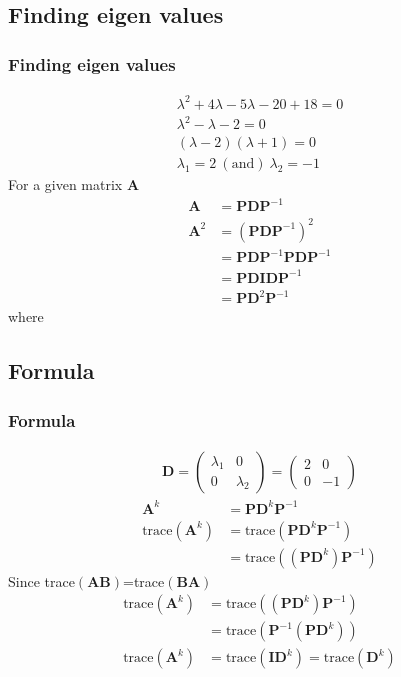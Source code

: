 \documentclass{beamer}
\providecommand{\brak}[1]{\ensuremath{\left(#1\right)}}
\theoremstyle{remark}
\newcommand{\myvec}[1]{\ensuremath{\begin{pmatrix}#1\end{pmatrix}}}
\let\vec\mathbf
\numberwithin{equation}{section}
\begin{document}
\subsection{Finding eigen values}
\begin{frame}
\frametitle{Finding eigen values}
 \begin{align}
     \lambda^2+4\lambda-5\lambda-20+18=0 \\
            \lambda^2-\lambda-2=0 \\
            \brak{\lambda-2}\brak{\lambda+1}=0 \\
            \lambda_1=2\ \brak{\text{and}}\ \lambda_2=-1
 \end{align}
 For a given matrix $\vec{A}$
\begin{align}
     \vec{A}&=\vec{P}\vec{D}\vec{P}^{-1} \\
      \vec{A}^2&=\brak{\vec{P}\vec{D}\vec{P}^{-1}}^2 \\
      &=\vec{P}\vec{D}\vec{P}^{-1}\vec{P}\vec{D}\vec{P}^{-1}\\
      &=\vec{P}\vec{D}\vec{I}\vec{D}\vec{P}^{-1}\\
      &=\vec{P}\vec{D}^2\vec{P}^{-1}
 \end{align}
 where 
 \end{frame}
 \subsection{Formula}
\begin{frame}
\frametitle{Formula}
 \begin{align}
\vec{D}=\myvec{\lambda_1&0\\0&\lambda_2}=\myvec{2&0\\0&-1}
 \end{align}
 \begin{align}
     \vec{A}^k&=\vec{P}\vec{D}^k\vec{P}^{-1}\\
\text{trace}\brak{\vec{A}^k}&=\text{trace}\brak{\vec{P}\vec{D}^k\vec{P}^{-1}} \\
&=\text{trace}\brak{\brak{\vec{P}\vec{D}^k}\vec{P}^{-1}} 
     \end{align}
     Since trace$\brak{\vec{AB}}$=trace$\brak{\vec{BA}}$
     \begin{align}
\text{trace}\brak{\vec{A}^k}&=\text{trace}\brak{\brak{\vec{P}\vec{D}^k}\vec{P}^{-1}}  \\
&=\text{trace}\brak{\vec{P}^{-1}\brak{\vec{P}\vec{D}^k}}  \\
\text{trace}\brak{\vec{A}^k}&=\text{trace}\brak{\vec{I}\vec{D}^k}=\text{trace}\brak{\vec{D}^k}
     \end{align}
\end{frame}
\end{document}

